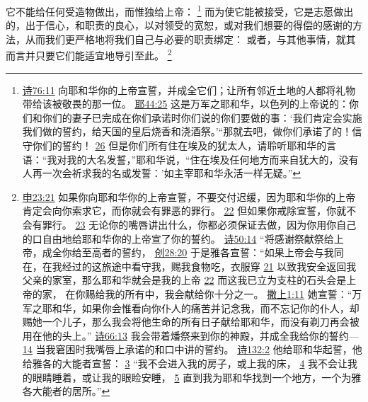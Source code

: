 \documentclass[12pt, a4paper, oneside]{ctexart}
\newcounter{parnum}[section]
\newcommand{\N}{%
   \noindent\refstepcounter{parnum}%
    \makebox[\parindent][l]{\textbf{\arabic{parnum}.}}}
\begin{document}
\N 它不能给任何受造物做出，而惟独给上帝：
	\footnote {
		\href{https://biblehub.com/psalms/76-11.htm}{诗76:11} 向耶和华你的上帝宣誓，并成全它们；让所有邻近土地的人都将礼物带给该被敬畏的那一位。
		\href{https://biblehub.com/jeremiah/44-25.htm}{耶44:25} 这是万军之耶和华，以色列的上帝说的：你们和你们的妻子已完成在你们承诺时你们说的你们要做的事：‘我们肯定会实施我们做的誓约，给天国的皇后烧香和浇酒祭。’“那就去吧，做你们承诺了的！信守你们的誓约！
		\href{https://biblehub.com/jeremiah/44-26.htm}{26} 但是你们所有住在埃及的犹太人，请聆听耶和华的言语：“我对我的大名发誓，”耶和华说，“住在埃及任何地方而来自犹大的，没有人再一次会祈求我的名或发誓：'如主宰耶和华永活一样无疑。”
	}
	而为使它能被接受，它是志愿做出的，出于信心，和职责的良心，以对领受的宽恕，或对我们想要的得偿的感谢的方法，从而我们更严格地将我们自己与必要的职责绑定： 或者，与其他事情，就其而言并只要它们能适宜地导引至此。
	\footnote {
		\href{https://biblehub.com/deuteronomy/23-21.htm}{申23:21} 如果你向耶和华你的上帝宣誓，不要交付迟缓，因为耶和华你的上帝肯定会向你索求它，而你就会有罪恶的罪行。
		\href{https://biblehub.com/deuteronomy/23-22.htm}{22} 但如果你戒除宣誓，你就不会有罪行。
		\href{https://biblehub.com/deuteronomy/23-23.htm}{23} 无论你的嘴唇讲出什么，你都必须保证去做，因为你用你自己的口自由地给耶和华你的上帝宣了你的誓约。
		\href{https://biblehub.com/psalms/50-14.htm}{诗50:14} “将感谢祭献祭给上帝，成全你给至高者的誓约，
		\href{https://biblehub.com/genesis/28-20.htm}{创28:20} 于是雅各宣誓：“如果上帝会与我同在，在我经过的这旅途中看守我，赐我食物吃，衣服穿
		\href{https://biblehub.com/genesis/28-21.htm}{21} 以致我安全返回我父亲的家室，那么耶和华就会是我的上帝
		\href{https://biblehub.com/genesis/28-22.htm}{22} 而这我已立为支柱的石头会是上帝的家， 在你赐给我的所有中，我会献给你十分之一。
		\href{https://biblehub.com/1_samuel/1-11.htm}{撒上1:11} 她宣誓：“万军之耶和华，如果你会惟看向你仆人的痛苦并记念我，而不忘记你的仆人，却赐她一个儿子，那么我会将他生命的所有日子献给耶和华，而没有剃刀再会被用在他的头上。”
		\href{https://biblehub.com/psalms/66-13.htm}{诗66:13} 我会带着燔祭来到你的神殿，并成全我给你的誓约---
		\href{https://biblehub.com/psalms/66-14.htm}{14} 当我窘困时我嘴唇上承诺的和口中讲的誓约。
		\href{https://biblehub.com/psalms/132-2.htm}{诗132:2} 他给耶和华起誓，他给雅各的大能者宣誓：
		\href{https://biblehub.com/psalms/132-3.htm}{3} “我不会进入我的房子，或上我的床，
		\href{https://biblehub.com/psalms/132-4.htm}{4} 我不会让我的眼睛睡着，或让我的眼睑安睡，
		\href{https://biblehub.com/psalms/132-5.htm}{5} 直到我为耶和华找到一个地方，一个为雅各大能者的居所。”
	}
\end{document}
